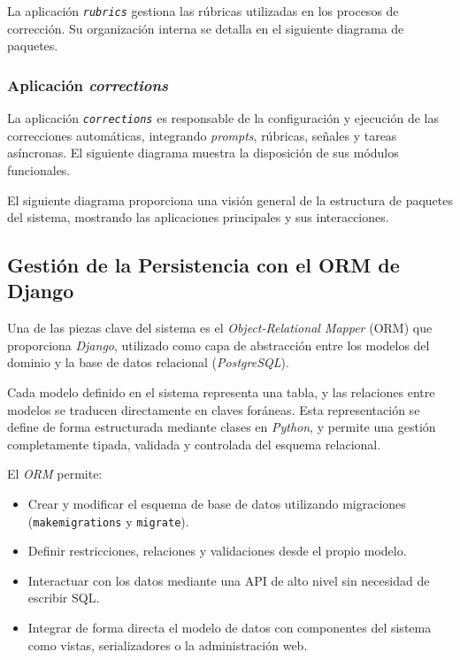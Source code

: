 La aplicación \texttt{\textit{rubrics}} gestiona las rúbricas utilizadas en los procesos de corrección. Su organización interna se detalla en el siguiente diagrama de paquetes.


\subsubsection{Aplicación \textit{corrections}}

La aplicación \texttt{\textit{corrections}} es responsable de la configuración y ejecución de las correcciones automáticas, integrando \textit{prompts}, rúbricas, señales y tareas asíncronas. El siguiente diagrama muestra la disposición de sus módulos funcionales.


El siguiente diagrama proporciona una visión general de la estructura de paquetes del sistema, mostrando las aplicaciones principales y sus interacciones.


\subsection{Gestión de la Persistencia con el ORM de Django}

Una de las piezas clave del sistema es el \textit{Object-Relational Mapper} (ORM) que proporciona \textit{Django}, utilizado como capa de abstracción entre los modelos del dominio y la base de datos relacional (\textit{PostgreSQL}). 

Cada modelo definido en el sistema representa una tabla, y las relaciones entre modelos se traducen directamente en claves foráneas. Esta representación se define de forma estructurada mediante clases en \textit{Python}, y permite una gestión completamente tipada, validada y controlada del esquema relacional.

El \textit{ORM} permite:

\begin{itemize}
  \item Crear y modificar el esquema de base de datos utilizando migraciones (\texttt{makemigrations} y \texttt{migrate}).
  \item Definir restricciones, relaciones y validaciones desde el propio modelo.
  \item Interactuar con los datos mediante una API de alto nivel sin necesidad de escribir SQL.
  \item Integrar de forma directa el modelo de datos con componentes del sistema como vistas, serializadores o la administración web.
\end{itemize}

